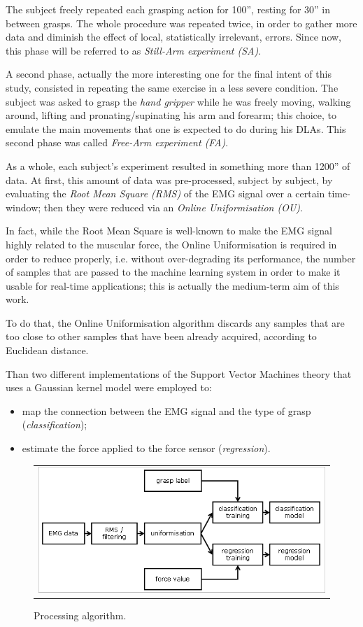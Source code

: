 The subject freely repeated each grasping action for 100'', resting for 30'' in between grasps. The whole procedure was repeated twice, in order to gather more data and diminish the effect of local, statistically irrelevant, errors. 
Since now, this phase will be referred to as \emph{Still-Arm experiment (SA)}.

A second phase, actually the more interesting one for the final intent of this study, consisted in repeating the same exercise in a less severe condition. The subject was asked to grasp the \textit{hand gripper} while he was freely moving, walking around, lifting and pronating/supinating his arm and forearm; this choice, to emulate the main movements that one is expected to do during his DLAs.
This second phase was called \emph{Free-Arm experiment (FA)}.


As a whole, each subject's experiment resulted in something more than 1200'' of data. At first, this amount of data was pre-processed, subject by subject, by evaluating the \emph{Root Mean Square (RMS)} of the EMG signal over a certain time-window; then they were reduced via an \emph{Online Uniformisation (OU)}.

In fact, while the Root Mean Square is well-known to make the EMG signal highly related to the muscular force, the Online Uniformisation is required in order to reduce properly, i.e. without over-degrading its performance, the number of samples that are passed to the machine learning system in order to make it usable for real-time applications; this is actually the medium-term aim of this work.

To do that, the Online Uniformisation algorithm discards any samples that are too close to other samples that have been already acquired, according to Euclidean distance.

Than two different implementations of the Support Vector Machines theory that uses a Gaussian kernel model were employed to:
\begin{itemize}
	\item map the connection between the EMG signal and the type of grasp (\textit{classification});
	\item estimate the force applied to the force sensor (\textit{regression}).
\end{itemize}

\begin{figure}[!t] \centering
  \begin{tabular}{c}
    \includegraphics[height=0.3\textheight]{figs/Schema} \\
  \end{tabular}
  \caption{Processing algorithm.}
  \label{fig:setup}
\end{figure}
